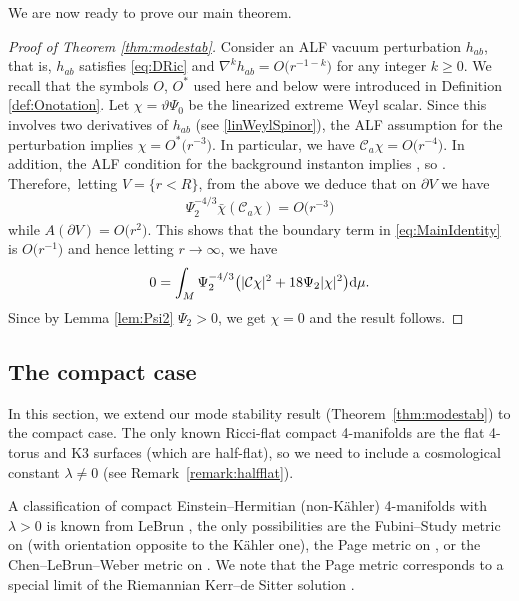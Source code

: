 \documentclass[10pt,a4paper]{amsart}
\numberwithin{equation}{section}
\begin{document}
We are now ready to prove our main theorem.

\begin{proof}[Proof of Theorem \ref{thm:modestab}]
Consider an ALF vacuum perturbation $h_{ab}$, that is, $h_{ab}$ satisfies \eqref{eq:DRic} and $\nabla^k h_{ab} = O\bigl(r^{-1-k}\bigr)$ for any integer $k \geq 0$. We recall that the symbols $O$, $O^{*}$ used here and below were introduced in Definition \ref{def:Onotation}.
Let $\chi = \vartheta \Psi_0$ be the linearized extreme Weyl scalar. Since this involves two derivatives of $h_{ab}$ (see \eqref{linWeylSpinor}), the ALF assumption for the perturbation implies $\chi = O^*\bigl(r^{-3}\bigr)$.
In particular, we have $\mathcal{C}_a \chi = O\bigl(r^{-4}\bigr)$. In addition, the ALF condition for the background instanton implies , so . Therefore,~letting ${V = \{r < R\}}$, from the above we deduce that on $\partial V$ we have
\begin{align*}
\Psi_{2}^{-4/3}\bar\chi(\mathcal{C}_{a}\chi) =O\bigl(r^{-3}\bigr)
\end{align*}
while $A(\partial V) = O\bigl(r^2\bigr)$. This shows that the boundary term in \eqref{eq:MainIdentity} is $O\bigl(r^{-1}\bigr)$ and hence letting $r \to \infty$, we have
\begin{align*}
0 = \int_{M}\Psi_{2}^{-4/3}\bigl(|\mathcal{C}\chi|^{2} + 18\Psi_{2}|\chi|^2\bigr){\rm d}\mu.
\end{align*}
Since by Lemma \ref{lem:Psi2} $\Psi_2 > 0$, we get $\chi=0$ and the result follows.
\end{proof}

\subsection{The compact case}
In this section, we extend our mode stability result (Theorem~\ref{thm:modestab})
to the compact case. The only known Ricci-flat compact 4-manifolds are the flat 4-torus and K3 surfaces (which are half-flat), so we need to include a cosmological constant $\lambda\neq0$ (see Remark~\ref{remark:halfflat}).

A classification of compact Einstein--Hermitian (non-K\"ahler) 4-manifolds with $\lambda>0$ is known from LeBrun \cite{MR2899877}, the only possibilities are the Fubini--Study metric on  (with orientation opposite to the K\"ahler one), the Page metric on , or the Chen--LeBrun--Weber metric on . We note that the Page metric corresponds to a special limit of the Riemannian Kerr--de Sitter solution \cite{Page}.
\end{document}
